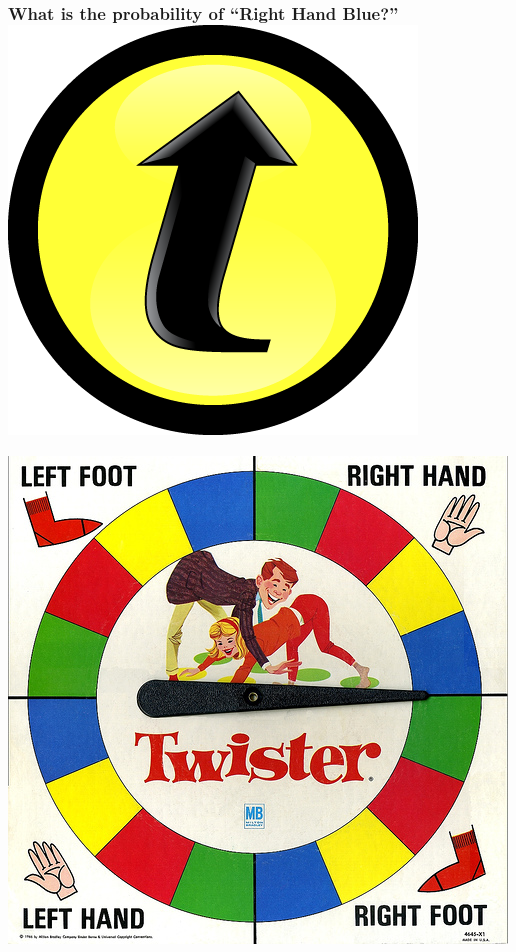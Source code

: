 \documentclass[handout]{beamer}
\begin{document}
\begin{frame}
\frametitle{What is the probability of ``Right Hand Blue?'' \hfill \includegraphics[scale = 0.05]{./images/clicker}}
\centering
	\includegraphics[scale = 0.6]{./images/twister}

\end{frame}
\end{document}
